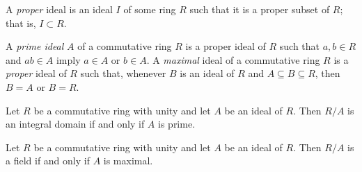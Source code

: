 
\begin{remark}
	A \textit{proper} ideal is an ideal $I$ of some ring $R$ such that it is a proper subset of $R$; that is, $I \subset R$.
\end{remark}

\begin{definition}
	A \textit{prime ideal} $A$ of a commutative ring $R$ is a proper ideal of $R$ such that $a,b \in R$ and $ab \in A$ imply $a \in A$ or $b \in A$. A \textit{maximal} ideal of a commutative ring $R$ is a \textit{proper} ideal of $R$ such that, whenever $B$ is an ideal of $R$ and $A \subseteq B \subseteq R$, then $B = A$ or $B = R$.
\end{definition}

\begin{theorem}
	Let $R$ be a commutative ring with unity and let $A$ be an ideal of $R$. Then $R/A$ is an integral domain if and only if $A$ is prime.
\end{theorem}

\begin{theorem}
	Let $R$ be a commutative ring with unity and let $A$ be an ideal of $R$. Then $R/A$ is a field if and only if $A$ is maximal.
\end{theorem}
